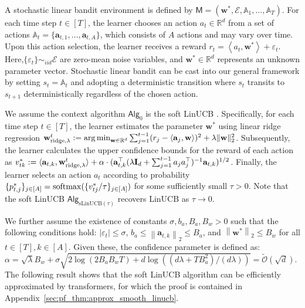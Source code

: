 \documentclass[10pt]{article}
\newcommand{\id}{\bI}
\newcommand{\eps}{\varepsilon}
\DeclareMathOperator*{\argmin}{arg\,min}
\newcommand{\norm}[1]{\left\|{#1}\right\|}
\newcommand{\ltwo}[1]{\norm{#1}_2}
\newcommand{\<}{\left\langle}
\renewcommand{\>}{\right\rangle}
\newcommand{\ridge}{{\rm ridge}}
\newcommand{\R}{\mathbb{R}}
\newcommand{\inst}{{\mathsf{M}}}
\newcommand{\sLinUCB}{{\mathrm{sLinUCB}}}
\newcommand{\temp}{{\tau}}
\newcommand{\cwid}{{\alpha}}
\newcommand{\tcO}{{\tilde{\mathcal O}}}
\newcommand{\action}{{a}}
\newcommand{\reward}{{r}}
\newcommand{\totlen}{{T}}
\newcommand{\softmax}{{\rm softmax}}
\newcommand{\sAlg}{{\mathsf{Alg}}}
\newcommand{\aset}{{\sA}}
\newcommand{\TrueLBPar}{{\bw^*}}
\newcommand{\Noise}{{\eps}}
\newcommand{\Noisedist}{{\mathcal{E}}}
\newcommand{\Numact}{{A}}
\def\sA{{\mathbb{A}}}
\def\bI{{\mathbf I}}
\def\ba{{\mathbf a}}
\def\bw{{\mathbf w}}
\begin{document}
A stochastic linear bandit environment is defined by $\inst=(\TrueLBPar,\Noisedist,\aset_1,\ldots,\aset_\totlen)$. For each time step $t\in[\totlen]$, the learner chooses an action $\action_t\in\R^{d}$ from a set of actions $\sA_t=\{\ba_{t,1},\ldots,\ba_{t,\Numact}\}$, which consists of $\Numact$ actions and may vary over time. Upon this action selection, the learner receives a reward $\reward_t=\<\action_t,\TrueLBPar\>+\Noise_t$. Here,$\{ \Noise_t \} \sim_{ iid} \Noisedist$ are zero-mean noise variables, and $\TrueLBPar\in\R^{d}$ represents an unknown parameter vector. Stochastic linear bandit can be cast into our general framework by setting $s_t = \aset_t$ and adopting a deterministic transition where $s_t$ transits to $s_{t+1}$ deterministically regardless of the chosen action. 






We assume the context algorithm $\sAlg_0$ is the soft LinUCB \citep{chu2011contextual}. Specifically, for each time step $t\in[\totlen]$, the learner estimates the parameter $\TrueLBPar$ using linear ridge regression $\bw^t_{\ridge,\lambda}:=\argmin_{\bw\in\R^d} \sum_{j=1}^{t-1}(\reward_j-\<\ba_j,\bw\>)^2+ \lambda \|\bw\|_2^2$. Subsequently, the learner calculates the upper confidence bounds for the reward of each action as $v^*_{tk}:=\langle \ba_{t,k},\bw^t_{\ridge,\lambda}\rangle +\cwid \cdot (\ba_{t,k}^\top (\lambda\id_d+\sum_{j=1}^{t-1}\action_j\action_j^\top)^{-1}  \ba_{t,k})^{1/2}$. Finally, the learner selects an action $\action_t$ according to probability $\{ p^*_{t,j} \}_{j \in [\Numact]} = \softmax(\{v^*_{tj}/\temp \}_{j \in [\Numact]})$ for some sufficiently small $\temp>0$. Note that the soft LinUCB $\sAlg_{\sLinUCB(\temp)}$ recovers LinUCB as $\temp\to 0$. 








We further assume the existence of constants $\sigma,b_a,B_a,B_w>0$ such that the following conditions hold:   $|\Noise_t|\leq\sigma$, $b_a\leq\ltwo{\ba_{t,k}}\leq B_a$, and $\ltwo{\bw^*}\le B_w$ for all $t\in[\totlen],k\in[\Numact]$. Given these, the confidence parameter is defined as: $\cwid=\sqrt{\lambda}B_w+\sigma\sqrt{2\log (2B_aB_w \totlen )+d\log((d\lambda+\totlen B_a^2)/(d\lambda))} = \tcO(\sqrt{d})$. The following result shows that the soft LinUCB algorithm can be efficiently approximated by transformers, for which the proof is contained in Appendix~\ref{sec:pf_thm:approx_smooth_linucb}. 
\end{document}
